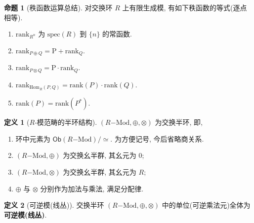 \documentclass{MainStyle}
\theoremstyle{definition}
\theoremstyle{definition}
\theoremstyle{definition}
\newtheorem{definition}{定义}
\theoremstyle{definition}
\newtheorem{proposition}{命题}
\theoremstyle{definition}
\theoremstyle{definition}
\theoremstyle{definition}
\theoremstyle{remark}
\theoremstyle{remark}
\begin{document}
\begin{proposition}[秩函数运算总结]
    对交换环 $R$ 上有限生成模, 有如下秩函数的等式(逐点相等).
    \begin{enumerate}
        \item $\mathrm{rank}_{R^n}$ 为 $\mathrm{spec}(R)$ 到 $\{n\}$ 的常函数.
        \item $\mathrm{rank}_{P\oplus Q}=\mathrm{P}+\mathrm{rank}_Q$.
        \item $\mathrm{rank}_{P\otimes Q}=\mathrm{P}\cdot \mathrm{rank}_Q$.
        \item $\mathrm{rank}_{\mathrm{Hom}_R(P,Q)}=\mathrm{rank}(P)\cdot \mathrm{rank}(Q)$.
        \item $\mathrm{rank}(P)=\mathrm{rank}(P^\ast)$.
    \end{enumerate}
\end{proposition}

\begin{definition}[$R$-模范畴的半环结构]
    $(R\mathrm{-Mod},\oplus, \otimes)$ 为交换半环, 即,
    \begin{enumerate}
        \item 环中元素为 $\mathsf{Ob}(R\mathrm{-Mod})/\simeq$. 为方便记号, 今后省略商关系.
        \item $(R\mathrm{-Mod},\oplus)$ 为交换幺半群, 其幺元为 $0$;
        \item $(R\mathrm{-Mod}, \otimes)$ 为交换幺半群, 其幺元为 $R$;
        \item $\oplus$ 与 $\otimes$ 分别作为加法与乘法, 满足分配律.
    \end{enumerate}
\end{definition}

\begin{definition}[可逆模(线丛)]
    交换半环 $(R\mathrm{-Mod},\oplus, \otimes)$ 中的单位(可逆乘法元)全体为\textbf{可逆模(线丛)}.
\end{definition}
\end{document}
